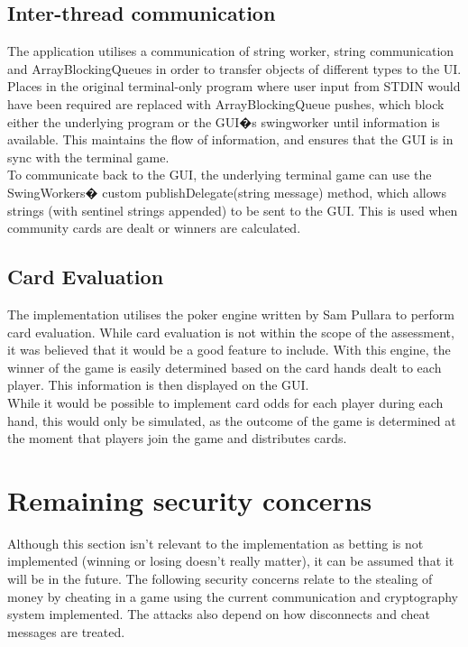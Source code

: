 \documentclass[11pt, oneside]{article}   	%
\begin{document}
\subsection {Inter-thread communication}

The application utilises a communication of string worker, string communication and ArrayBlockingQueues in order to transfer objects of different types to the UI. Places in the original terminal-only program where user input from STDIN would have been required are replaced with ArrayBlockingQueue pushes, which block either the underlying program or the GUI�s swingworker until information is available. This maintains the flow of information, and ensures that the GUI is in sync with the terminal game.\\

To communicate back to the GUI, the underlying terminal game can use the SwingWorkers� custom publishDelegate(string message) method, which allows strings (with sentinel strings appended) to be sent to the GUI. This is used when community cards are dealt or winners are calculated.

\subsection{Card Evaluation}

The implementation utilises the poker engine written by Sam Pullara to perform card evaluation. While card evaluation is not within the scope of the assessment, it was believed that it would be a good feature to include. With this engine, the winner of the game is easily determined based on the card hands dealt to each player. This information is then displayed on the GUI.\\

While it would be possible to implement card odds for each player during each hand, this would only be simulated, as the outcome of the game is determined at the moment that players join the game and distributes cards.

\section{Remaining security concerns}
\label{sec:securityConcerns}

Although this section isn't relevant to the implementation as betting is not implemented (winning or losing doesn't really matter), it can be assumed that it will be in the future. The following security concerns relate to the stealing of money by cheating in a game using the current communication and cryptography system implemented. The attacks also depend on how disconnects and cheat messages are treated.\\
\end{document}
